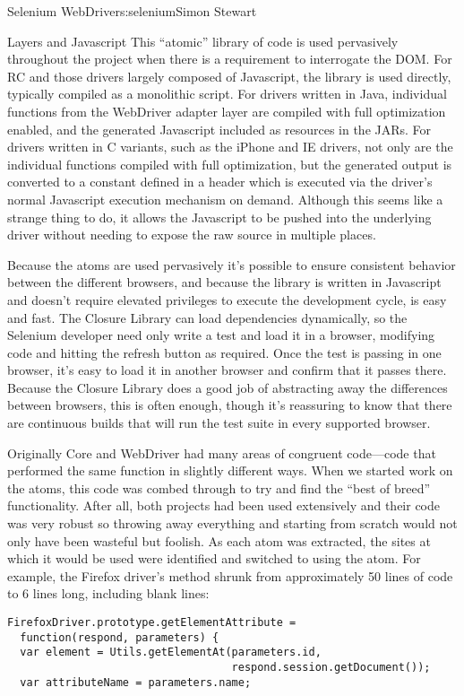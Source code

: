 \begin{aosachapter}{Selenium WebDriver}{s:selenium}{Simon Stewart}
\begin{aosasect1}{Layers and Javascript}
This ``atomic'' library of code is used pervasively throughout the
project when there is a requirement to interrogate the DOM\@.  For RC
and those drivers largely composed of Javascript, the library is used
directly, typically compiled as a monolithic script. For drivers
written in Java, individual functions from the WebDriver adapter layer
are compiled with full optimization enabled, and the generated
Javascript included as resources in the JARs. For drivers written in C
variants, such as the iPhone and IE drivers, not only are the
individual functions compiled with full optimization, but the
generated output is converted to a constant defined in a header which
is executed via the driver's normal Javascript execution mechanism on
demand. Although this seems like a strange thing to do, it allows the
Javascript to be pushed into the underlying driver without needing to
expose the raw source in multiple places.

Because the atoms are used pervasively it's possible to ensure
consistent behavior between the different browsers, and because the
library is written in Javascript and doesn't require elevated
privileges to execute the development cycle, is easy and fast. The
Closure Library can load dependencies dynamically, so the Selenium
developer need only write a test and load it in a browser, modifying
code and hitting the refresh button as required. Once the test is
passing in one browser, it's easy to load it in another browser and
confirm that it passes there. Because the Closure Library does a good
job of abstracting away the differences between browsers, this is
often enough, though it's reassuring to know that there are continuous
builds that will run the test suite in every supported browser.

Originally Core and WebDriver had many areas of congruent code---code
that performed the same function in slightly different ways. When we
started work on the atoms, this code was combed through to try and
find the ``best of breed'' functionality. After all, both projects had
been used extensively and their code was very robust so throwing away
everything and starting from scratch would not only have been wasteful
but foolish.  As each atom was extracted, the sites at which it would
be used were identified and switched to using the atom. For example,
the Firefox driver's  method shrunk from
approximately 50 lines of code to 6 lines long, including blank lines:

\begin{verbatim}
FirefoxDriver.prototype.getElementAttribute =
  function(respond, parameters) {
  var element = Utils.getElementAt(parameters.id,
                                   respond.session.getDocument());
  var attributeName = parameters.name;


\end{verbatim}
\end{aosasect1}
\end{aosachapter}
